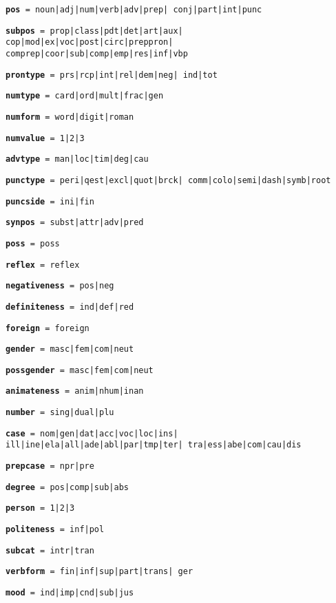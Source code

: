 \documentclass[11pt]{article}
\begin{document}
\begin{compactitem}
\item \texttt{\textbf{pos} = noun|adj|num|verb|adv|prep| conj|part|int|punc}
\item \texttt{\textbf{subpos} = prop|class|pdt|det|art|aux| cop|mod|ex|voc|post|circ|preppron| comprep|coor|sub|comp|emp|res|inf|vbp}
\item \texttt{\textbf{prontype} = prs|rcp|int|rel|dem|neg| ind|tot}
\item \texttt{\textbf{numtype} = card|ord|mult|frac|gen}
\item \texttt{\textbf{numform} = word|digit|roman}
\item \texttt{\textbf{numvalue} = 1|2|3}
\item \texttt{\textbf{advtype} = man|loc|tim|deg|cau}
\item \texttt{\textbf{punctype} = peri|qest|excl|quot|brck| comm|colo|semi|dash|symb|root}
\item \texttt{\textbf{puncside} = ini|fin}
\item \texttt{\textbf{synpos} = subst|attr|adv|pred}
\item \texttt{\textbf{poss} = poss}
\item \texttt{\textbf{reflex} = reflex}
\item \texttt{\textbf{negativeness} = pos|neg}
\item \texttt{\textbf{definiteness} = ind|def|red}
\item \texttt{\textbf{foreign} = foreign}
\item \texttt{\textbf{gender} = masc|fem|com|neut}
\item \texttt{\textbf{possgender} = masc|fem|com|neut}
\item \texttt{\textbf{animateness} = anim|nhum|inan}
\item \texttt{\textbf{number} = sing|dual|plu}
\item \texttt{\textbf{case} = nom|gen|dat|acc|voc|loc|ins| ill|ine|ela|all|ade|abl|par|tmp|ter| tra|ess|abe|com|cau|dis}
\item \texttt{\textbf{prepcase} = npr|pre}
\item \texttt{\textbf{degree} = pos|comp|sub|abs}
\item \texttt{\textbf{person} = 1|2|3}
\item \texttt{\textbf{politeness} = inf|pol}
\item \texttt{\textbf{subcat} = intr|tran}
\item \texttt{\textbf{verbform} = fin|inf|sup|part|trans| ger}
\item \texttt{\textbf{mood} = ind|imp|cnd|sub|jus}

\end{compactitem}
\end{document}

